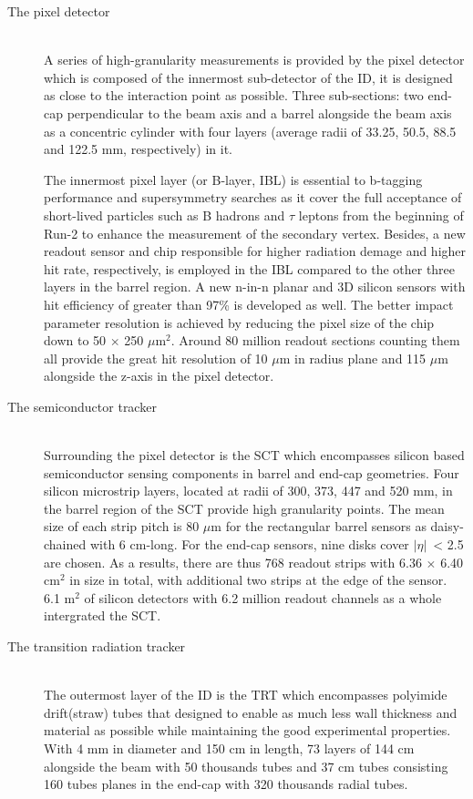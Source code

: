 \documentclass[UTF8,12pt]{ctexart}
\numberwithin{equation}{section}
\def\abseta{$|$$\eta$$|$~}
\begin{document}
\begin{description}
 \item[The pixel detector] \mbox{} \\
A series of high-granularity measurements is provided by the pixel detector which is composed of the innermost sub-detector of the ID, it is designed as close to the interaction point as possible. Three sub-sections: two end-cap perpendicular to the beam axis and a barrel alongside the beam axis as a concentric cylinder with four layers (average radii of 33.25, 50.5, 88.5 and 122.5 mm, respectively) in it. 

The innermost pixel layer (or B-layer, IBL) is essential to b-tagging performance and supersymmetry searches as it cover the full acceptance of short-lived particles such as B hadrons and $\tau$ leptons from the beginning of Run-2 to enhance the measurement of the secondary vertex. Besides, a new readout sensor and chip responsible for higher radiation demage and higher hit rate, respectively, is employed in the IBL compared to the other three layers in the barrel region. A new  n-in-n planar and 3D silicon sensors with hit efficiency of greater than 97\% is developed as well. The better impact parameter resolution is achieved by reducing the pixel size of the chip down to 50 $\times$ 250 $\mu$m$^2$.  Around 80 million readout sections counting them all provide the great  hit resolution of 10 $\mu$m in radius plane and 115 $\mu$m alongside the z-axis in the pixel detector.

 \item[The semiconductor tracker] \mbox{} \\
 Surrounding the pixel detector is the SCT which encompasses silicon based semiconductor sensing components in barrel and end-cap geometries. Four silicon microstrip layers, located at radii of 300, 373, 447 and 520 mm, in the barrel region of the SCT provide high granularity points. The mean size of each strip pitch is 80 $\mu$m for the rectangular barrel sensors as daisy-chained with 6 cm-long. For the end-cap sensors, nine disks cover \abseta  < 2.5 are chosen. As a results, there are thus 768 readout strips with 6.36 $\times$ 6.40  cm$^2$ in size in total, with additional two strips at the edge of the sensor. 6.1 m$^2$ of silicon detectors with 6.2 million readout channels as a whole intergrated the SCT. 
 
 \item[The transition radiation tracker] \mbox{} \\
 The outermost layer of the ID is the TRT which encompasses polyimide drift(straw) tubes that designed to enable as much less wall thickness and material as possible while maintaining the good experimental properties. With 4 mm in diameter and 150 cm in length, 73 layers of 144 cm alongside the beam with 50 thousands tubes and 37 cm tubes consisting 160 tubes planes in the end-cap with 320 thousands radial tubes.
 

\end{description}
\end{document}
